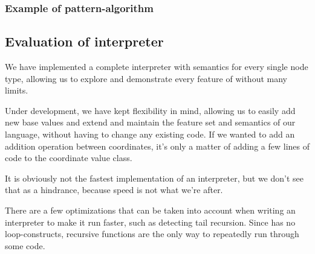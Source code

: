\subsubsection{Example of pattern-algorithm}
\label{sec:patternalg}


\subsection{Evaluation of interpreter}
We have implemented a complete interpreter with semantics for every
single node type, allowing us to explore and demonstrate every feature
of \productname{} without many limits.

Under development, we have kept flexibility in mind, allowing us to
easily add new base values and extend and maintain the feature set and
semantics of our language, without having to change any existing code.
If we wanted to add an addition operation between coordinates, it's only
a matter of adding a few lines of code to the coordinate value class.

It is obviously not the fastest implementation of an interpreter, but we
don't see that as a hindrance, because speed is not what we're after.

There are a few optimizations that can be taken into account when
writing an interpreter to make it run faster, such as detecting tail
recursion. Since \productname{} has no loop-constructs, recursive
functions are the only way to repeatedly run through some code.

